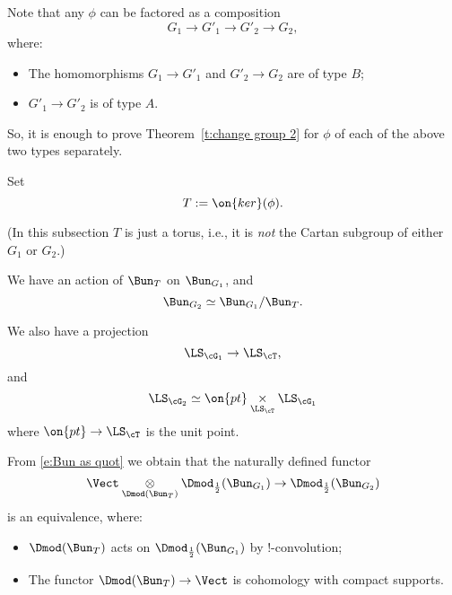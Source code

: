 \documentclass[9pt]{amsart}
\theoremstyle{remark}
\newtheorem{rem}[subsubsection]{Remark}
\theoremstyle{definition}
\theoremstyle{remark}
\newcommand{\thmref}[1]{Theorem~\ref{#1}}
\newcommand{\corref}[1]{Corollary~\ref{#1}}
\numberwithin{equation}{section}
\begin{document}
Note that any $\phi$ can be factored as a composition
$$G_1\to G'_1\to G'_2\to G_2,$$
where:

\begin{itemize}

\item The homomorphisms $G_1\to G'_1$ and $G'_2\to G_2$ are of type $B$;

\item $G'_1\to G'_2$ is of type $A$. 

\end{itemize}

\medskip

So, it is enough to prove \thmref{t:change group 2} for $\phi$ of each of the above two types separately. 


 \label{sss:type B}

Set 
$$T:=\on{ker}(\phi).$$ 

(In this subsection $T$ is just a torus, i.e., it is \emph{not} the Cartan subgroup of either $G_1$ or $G_2$.)

\medskip

We have an action of $\Bun_T$ on $\Bun_{G_1}$, and 
\begin{equation} \label{e:Bun as quot}
\Bun_{G_2}\simeq \Bun_{G_1}/\Bun_T.
\end{equation} 

We also have a projection
$$\LS_{\cG_1}\to \LS_\cT,$$
and 
\begin{equation} \label{e:LS as fiber}
\LS_{\cG_2}\simeq \on{pt}\underset{\LS_\cT}\times \LS_{\cG_1}
\end{equation} 
where $\on{pt}\to \LS_\cT$ is the unit point. 

\medskip

From \eqref{e:Bun as quot} we obtain that the naturally defined functor 
\begin{equation} \label{e:Bun as quot bis}
\Vect \underset{\Dmod(\Bun_T)}\otimes \Dmod_{\frac{1}{2}}(\Bun_{G_1})\to \Dmod_{\frac{1}{2}}(\Bun_{G_2})
\end{equation} 
is an equivalence, where:

\begin{itemize}

\item $\Dmod(\Bun_T)$ acts on $\Dmod_{\frac{1}{2}}(\Bun_{G_1})$ by !-convolution;

\item The functor $\Dmod(\Bun_T)\to \Vect$ is cohomology with compact supports. 

\end{itemize}
\end{document}
